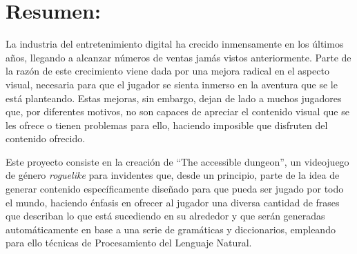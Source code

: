 \section*{Resumen:}

La industria del entretenimiento digital ha crecido inmensamente en los últimos años, llegando a alcanzar números de ventas jamás vistos anteriormente.
Parte de la razón de este crecimiento viene dada por una mejora radical en el aspecto visual, necesaria para que el jugador se sienta inmerso en la aventura que se le está planteando.
Estas mejoras, sin embargo, dejan de lado a muchos jugadores que, por diferentes motivos, no son capaces de apreciar el contenido visual que se les ofrece o tienen problemas para ello, haciendo imposible que disfruten del contenido ofrecido.

Este proyecto consiste en la creación de ``The accessible dungeon'', un videojuego de género \textit{roguelike} para invidentes que, desde un principio, parte de la idea de generar contenido específicamente diseñado para que pueda ser jugado por todo el mundo, haciendo énfasis en ofrecer al jugador una diversa cantidad de frases que describan lo que está sucediendo en su alrededor y que serán generadas automáticamente en base a una serie de gramáticas y diccionarios, empleando para ello técnicas de Procesamiento del Lenguaje Natural.
